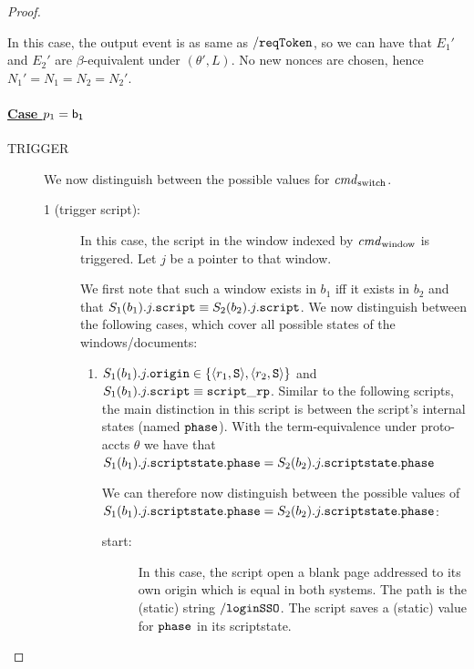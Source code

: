 \begin{proof}
\begin{itemize}
        In this case, the output event is as same as $\mathtt{/reqToken}$, 
        so we can have that $E_1'$ and $E_2'$ are $\beta$-equivalent under $(\theta\prime, L)$.
        No new nonces are chosen, hence $N_1\prime=N_1=N_2=N_2\prime$.
    \end{itemize}

    \paragraph{\underline{Case $p_1 = \mathsf{b_1}$}}

    \begin{description}
      \item[TRIGGER] We now distinguish between the possible values for $\mathit{cmd}_\text{switch}$.
        \begin{description}
          \item[1 (trigger script):] In this case, the script in the window indexed by $\mathit{cmd}_\text{window}$ is triggered. Let $j$ be a pointer to that window.
            
            We first note that such a window exists in $b_1$ iff it exists in $b_2$ and that $S_1(b_1).j.\mathtt{script} \equiv S_2(b_2).j.\mathtt{script}$. 
            We now distinguish between the following cases, which cover all possible states of the windows/documents:
            
            \begin{enumerate}
            \item $S_1(b_1).j.\mathtt{origin} \in \{\langle r_1,\mathtt{S}\rangle,\langle r_2,\mathtt{S}\rangle\}$ and $S_1(b_1).j.\mathtt{script} \equiv \mathtt{script\_rp}$.
              Similar to the following scripts, the main distinction in this script is between the script's internal states (named $\mathtt{phase}$). 
              With the term-equivalence under proto-accts $\theta$ we have that $S_1(b_1).j.\mathtt{scriptstate}.\mathtt{phase} = S_2(b_2).j.\mathtt{scriptstate}.\mathtt{phase}$ 
              
              We can therefore now distinguish between the possible values of $S_1(b_1).j.\mathtt{scriptstate}.\mathtt{phase} = S_2(b_2).j.\mathtt{scriptstate}.\mathtt{phase}$:
              \begin{description}
              \item[start:] In this case, the script open a blank page addressed to its own origin which is equal in both systems.
                The path is the (static) string $\mathtt{/loginSSO}$. 
                The script saves a (static) value for $\mathtt{phase}$ in its scriptstate.
      

\end{description}
\end{enumerate}
\end{description}
\end{description}
\end{proof}
